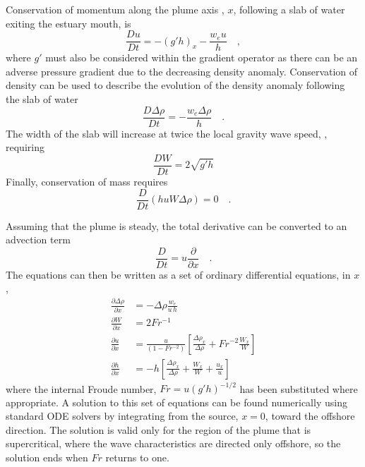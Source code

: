 \documentclass[12pt]{article}
\begin{document}
Conservation of momentum along the plume axis , $x$, following a slab of water exiting the estuary mouth, is
\begin{equation}
    \frac{Du}{Dt} = -(g' h)_x - \frac{w_e u}{h} \quad ,
\end{equation}
where $g'$ must also be considered within the gradient operator as there can be an adverse pressure gradient due to the decreasing density anomaly. Conservation of density can be used to describe the evolution of the density anomaly following the slab of water
\begin{equation}
    \frac{D \Delta\rho}{Dt} = -\frac{w_e \Delta\rho}{h} \quad .
\end{equation}
The width of the slab will increase at twice the local gravity wave speed, \citep[see][as discussed above]{hetland.macdonald:08}, requiring
\begin{equation}
    \frac{D W}{Dt} = 2 \sqrt{g' h}
\end{equation}
Finally, conservation of mass requires
\begin{equation}
    \frac{D}{Dt}\left( h u W \Delta\rho \right) = 0 \quad .
\end{equation}

Assuming that the plume is steady, the total derivative can be converted to an advection term
\begin{equation}
    \frac{D}{Dt} = u\frac{\partial}{\partial x} \quad .
\end{equation}
The equations can then be written as a set of ordinary differential equations, in $x$,
\begin{align}
\frac{\partial \Delta\rho}{\partial x} &= - \Delta \rho \frac{w_e}{u\,h} \label{eq:mass_sys}\\
\frac{\partial W}{\partial x} &=  2 Fr^{-1}\label{eq:width_sys}\\
\frac{\partial u}{\partial x} &= \frac{u}{(1 - Fr^{-2})}\left[ \frac{\Delta \rho_x}{\Delta \rho} + Fr^{-2} \frac{W_x}{W} \right] \label{eq:moment_sys}\\
\frac{\partial h}{\partial x} &= - h \left[  \frac{\Delta\rho_x}{\Delta\rho} + \frac{W_x}{W} +  \frac{u_x}{u} \right] \label{eq:cont_sys}
\end{align}
where the internal Froude number, $Fr = u (g' h)^{-1/2}$ has been substituted where appropriate. A solution to this set of equations can be found numerically using standard ODE solvers by integrating from the source, $x=0$, toward the offshore direction. The solution is valid only for the region of the plume that is supercritical, where the wave characteristics are directed only offshore, so the solution ends when $Fr$ returns to one.
\end{document}
